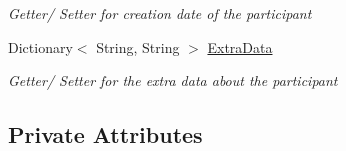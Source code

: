 \begin{DoxyCompactItemize}
\begin{DoxyCompactList}\small\item\em Getter/ Setter for creation date of the participant \end{DoxyCompactList}\item 
Dictionary$<$ String, String $>$ \hyperlink{class_web_analyzer_1_1_models_1_1_base_1_1_experiment_participant_a64873ae3257de2a7a03333356dfee9ee}{Extra\+Data}
\begin{DoxyCompactList}\small\item\em Getter/ Setter for the extra data about the participant \end{DoxyCompactList}\end{DoxyCompactItemize}
\subsection*{Private Attributes}
